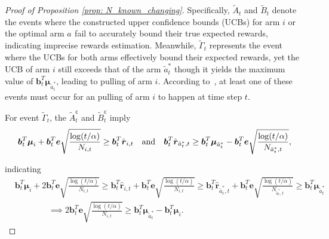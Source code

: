 \begin{proof}[Proof of Proposition \ref{prop: N_known_changing}]
Specifically, $\tilde{A}_t$ and $\tilde{B}_t$ denote the events where the constructed upper confidence bounds (UCBs) for arm $i$ or the optimal arm $a^{}$ fail to accurately bound their true expected rewards, indicating imprecise rewards estimation. Meanwhile, $\tilde{\Gamma}_t$ represents the event where the UCBs for both arms effectively bound their expected rewards, yet the UCB of arm $i$ still exceeds that of the arm $\tilde{a}_{t}^{*}$ though it yields the maximum value of $\boldsymbol{b}_t^T \boldsymbol{\mu}_{\tilde{a}_{t}^{*}}$, leading to pulling of arm $i$. According to~\cite{auer2002finite}, at least one of these events must occur for an pulling of arm $i$ to happen at time step $t$.

For event $\tilde{\Gamma}_t$, the $\tilde{A}_t^{\mathsf{c}}$ and $\tilde{B}_t^{\mathsf{c}}$ imply
\[
\boldsymbol{b}_{t}^{T} \boldsymbol{\mu}_{i} + \boldsymbol{b}_{t}^{T} \boldsymbol{e} \sqrt{\frac{ \log(t/\alpha)}{N_{i,t}}}
\geq
\boldsymbol{b}_{t}^{T} \hat{\boldsymbol{r}}_{i,t}
\quad \text{and} \quad
\boldsymbol{b}_{t}^{T} \hat{\boldsymbol{r}}_{\tilde{a}_{t}^{*},t} \geq \boldsymbol{b}_{t}^{T} \boldsymbol{\mu}_{\tilde{a}_{t}^{*}} - \boldsymbol{b}_{t}^{T} \boldsymbol{e} \sqrt{\frac{ \log(t/\alpha)}{N_{\tilde{a}_{t}^{*},t}}}, \\
\]

indicating 
\[
\begin{aligned}
& \boldsymbol{b}_{t}^{T} \boldsymbol{\mu}_{i} + 2 \boldsymbol{b}_{t}^{T} \boldsymbol{e} \sqrt{\frac{ \log(t/\alpha)}{N_{i,t}}}
\geq
\boldsymbol{b}_{t}^{T} \hat{\boldsymbol{r}}_{i,t} + \boldsymbol{b}_{t}^{T} \boldsymbol{e} \sqrt{\frac{ \log(t/\alpha)}{N_{i,t}}} 
\geq
\boldsymbol{b}_{t}^{T} \hat{\boldsymbol{r}}_{\tilde{a}_{t}^{*},t} + \boldsymbol{b}_{t}^{T} \boldsymbol{e} \sqrt{\frac{ \log(t/\alpha)}{N_{\tilde{a}_{t}^{*},t}}}
\geq
\boldsymbol{b}_{t}^{T} \boldsymbol{\mu}_{\tilde{a}_{t}^{*}} \\
& \qquad \qquad \implies
2 \boldsymbol{b}_{t}^{T} \boldsymbol{e} \sqrt{\frac{ \log(t/\alpha)}{N_{i,t}}} 
\geq
\boldsymbol{b}_{t}^{T} \boldsymbol{\mu}_{\tilde{a}_{t}^{*}} - \boldsymbol{b}_{t}^{T} \boldsymbol{\mu}_{i}.
\end{aligned}
\]


\end{proof}
